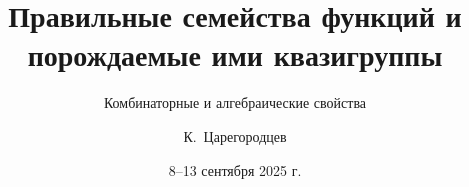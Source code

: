 
\title[Правильные семейства и квазигруппы]
{Правильные семейства функций и порождаемые ими
квазигруппы}
\subtitle{Комбинаторные и алгебраические свойства}
\date{8--13 сентября 2025 г.}
\author{К.~Царегородцев}

